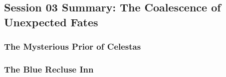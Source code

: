 \subsection{Session 03 Summary: The Coalescence of Unexpected Fates}

\subsubsection{The Mysterious Prior of Celestas}



\subsubsection{The Blue Recluse Inn}